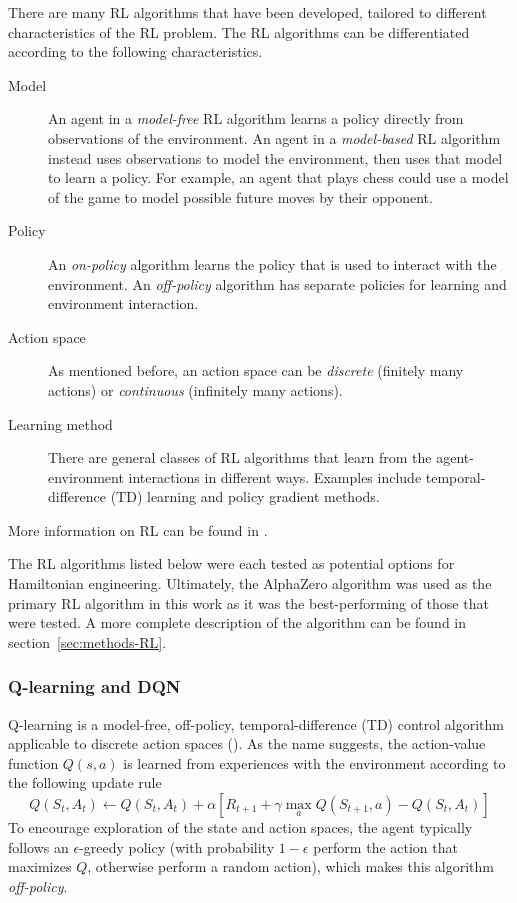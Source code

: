 There are many RL algorithms that have been developed, tailored to different characteristics of the RL problem. The RL algorithms can be differentiated according to the following characteristics.
\begin{description}
    \item[Model] An agent in a \emph{model-free} RL algorithm learns a policy directly from observations of the environment. An agent in a \emph{model-based} RL algorithm instead uses observations to model the environment, then uses that model to learn a policy. For example, an agent that plays chess could use a model of the game to model possible future moves by their opponent.
    \item[Policy] An \emph{on-policy} algorithm learns the policy that is used to interact with the environment. An \emph{off-policy} algorithm has separate policies for learning and environment interaction.
    \item[Action space] As mentioned before, an action space can be \emph{discrete} (finitely many actions) or \emph{continuous} (infinitely many actions).
    \item[Learning method] There are general classes of RL algorithms that learn from the agent-environment interactions in different ways. Examples include temporal-difference (TD) learning and policy gradient methods.
\end{description}
More information on RL can be found in \cite{sutton2018reinforcement}.

The RL algorithms listed below were each tested as potential options for Hamiltonian engineering. Ultimately, the AlphaZero algorithm was used as the primary RL algorithm in this work as it was the best-performing of those that were tested. A more complete description of the algorithm can be found in section~\ref{sec:methods-RL}.

\subsubsection{Q-learning and DQN}

Q-learning is a model-free, off-policy, temporal-difference (TD) control algorithm applicable to discrete action spaces (\cite{watkins1989learning}). As the name suggests, the action-value function $Q(s,a)$ is learned from experiences with the environment according to the following update rule
\begin{equation}\label{eq:Q_learning_update}
    Q(S_t, A_t) \leftarrow Q(S_t, A_t) +
        \alpha \left[ R_{t+1} + \gamma \max_a Q(S_{t+1}, a) - Q(S_t, A_t) \right]
\end{equation}
To encourage exploration of the state and action spaces, the agent typically follows an $\epsilon$-greedy policy (with probability $1-\epsilon$ perform the action that maximizes $Q$, otherwise perform a random action), which makes this algorithm \emph{off-policy}.

